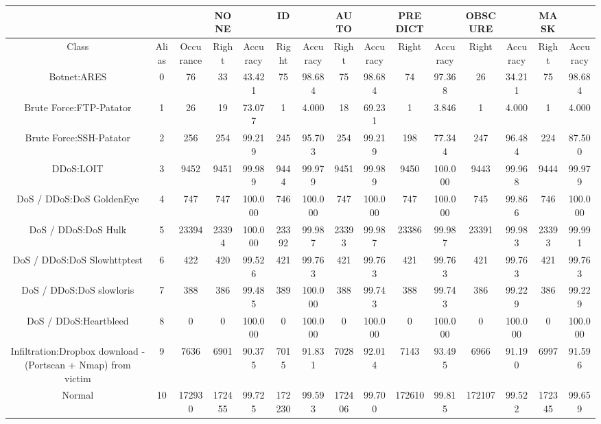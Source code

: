 \begin{table}[htb]
    \centering
    \begin{tabular}{@{}ccccccccccccccc@{}}
        \toprule
         &  &  & NONE &  & ID &  & AUTO &  & PREDICT &  & OBSCURE &  & MASK &  \\
        \midrule
        Class &  Alias &  Occurance &  Right &  Accuracy &  Right &  Accuracy &  Right &  Accuracy &  Right &  Accuracy &  Right &  Accuracy &  Right &  Accuracy \\
        Botnet:ARES &  0 &  76 &  33 &  43.421 &  75 &  98.684 &  75 &  98.684 &  74 &  97.368 &  26 &  34.211 &  75 &  98.684 \\
        Brute Force:FTP-Patator &  1 &  26 &  19 &  73.077 &  1 &  4.000 &  18 &  69.231 &  1 &  3.846 &  1 &  4.000 &  1 &  4.000 \\
        Brute Force:SSH-Patator &  2 &  256 &  254 &  99.219 &  245 &  95.703 &  254 &  99.219 &  198 &  77.344 &  247 &  96.484 &  224 &  87.500 \\
        DDoS:LOIT &  3 &  9452 &  9451 &  99.989 &  9444 &  99.979 &  9451 &  99.989 &  9450 &  100.000 &  9443 &  99.968 &  9444 &  99.979 \\
        DoS / DDoS:DoS GoldenEye &  4 &  747 &  747 &  100.000 &  746 &  100.000 &  747 &  100.000 &  747 &  100.000 &  745 &  99.866 &  746 &  100.000 \\
        DoS / DDoS:DoS Hulk &  5 &  23394 &  23394 &  100.000 &  23392 &  99.987 &  23393 &  99.987 &  23386 &  99.987 &  23391 &  99.983 &  23393 &  99.991 \\
        DoS / DDoS:DoS Slowhttptest &  6 &  422 &  420 &  99.526 &  421 &  99.763 &  421 &  99.763 &  421 &  99.763 &  421 &  99.763 &  421 &  99.763 \\
        DoS / DDoS:DoS slowloris &  7 &  388 &  386 &  99.485 &  389 &  100.000 &  388 &  99.743 &  388 &  99.743 &  386 &  99.229 &  386 &  99.229 \\
        DoS / DDoS:Heartbleed &  8 &  0 &  0 &  100.000 &  0 &  100.000 &  0 &  100.000 &  0 &  100.000 &  0 &  100.000 &  0 &  100.000 \\
        Infiltration:Dropbox download - (Portscan + Nmap) from victim &  9 &  7636 &  6901 &  90.375 &  7015 &  91.831 &  7028 &  92.014 &  7143 &  93.495 &  6966 &  91.190 &  6997 &  91.596 \\
        Normal &  10 &  172930 &  172455 &  99.725 &  172230 &  99.593 &  172406 &  99.700 &  172610 &  99.815 &  172107 &  99.522 &  172345 &  99.659 \\

\end{tabular}
\end{table}
